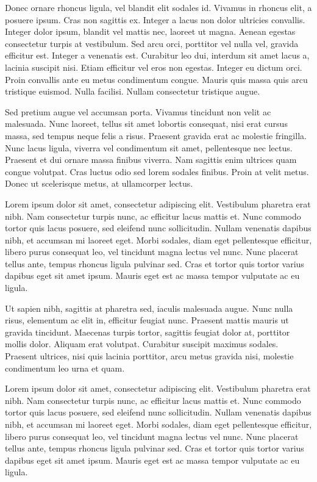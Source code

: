 \documentclass[a4paper]{memoir}
\begin{document}
Donec ornare rhoncus ligula, vel blandit elit sodales id. Vivamus in rhoncus elit, a posuere ipsum. Cras non sagittis ex. Integer a lacus non dolor ultricies convallis. Integer dolor ipsum, blandit vel mattis nec, laoreet ut magna. Aenean egestas consectetur turpis at vestibulum. Sed arcu orci, porttitor vel nulla vel, gravida efficitur est. Integer a venenatis est. Curabitur leo dui, interdum sit amet lacus a, lacinia suscipit nisi. Etiam efficitur vel eros non egestas. Integer eu dictum orci. Proin convallis ante eu metus condimentum congue. Mauris quis massa quis arcu tristique euismod. Nulla facilisi. Nullam consectetur tristique augue. 

Sed pretium augue vel accumsan porta. Vivamus tincidunt non velit ac malesuada. Nunc laoreet, tellus sit amet lobortis consequat, nisi erat cursus massa, sed tempus neque felis a risus. Praesent gravida erat ac molestie fringilla. Nunc lacus ligula, viverra vel condimentum sit amet, pellentesque nec lectus. Praesent et dui ornare massa finibus viverra. Nam sagittis enim ultrices quam congue volutpat. Cras luctus odio sed lorem sodales finibus. Proin at velit metus. Donec ut scelerisque metus, at ullamcorper lectus. 

Lorem ipsum dolor sit amet, consectetur adipiscing elit. Vestibulum pharetra erat nibh. Nam consectetur turpis nunc, ac efficitur lacus mattis et. Nunc commodo tortor quis lacus posuere, sed eleifend nunc sollicitudin. Nullam venenatis dapibus nibh, et accumsan mi laoreet eget. Morbi sodales, diam eget pellentesque efficitur, libero purus consequat leo, vel tincidunt magna lectus vel nunc. Nunc placerat tellus ante, tempus rhoncus ligula pulvinar sed. Cras et tortor quis tortor varius dapibus eget sit amet ipsum. Mauris eget est ac massa tempor vulputate ac eu ligula. 

Ut sapien nibh, sagittis at pharetra sed, iaculis malesuada augue. Nunc nulla risus, elementum ac elit in, efficitur feugiat nunc. Praesent mattis mauris ut gravida tincidunt. Maecenas turpis tortor, sagittis feugiat dolor at, porttitor mollis dolor. Aliquam erat volutpat. Curabitur suscipit maximus sodales. Praesent ultrices, nisi quis lacinia porttitor, arcu metus gravida nisi, molestie condimentum leo urna et quam. 

Lorem ipsum dolor sit amet, consectetur adipiscing elit. Vestibulum pharetra erat nibh. Nam consectetur turpis nunc, ac efficitur lacus mattis et. Nunc commodo tortor quis lacus posuere, sed eleifend nunc sollicitudin. Nullam venenatis dapibus nibh, et accumsan mi laoreet eget. Morbi sodales, diam eget pellentesque efficitur, libero purus consequat leo, vel tincidunt magna lectus vel nunc. Nunc placerat tellus ante, tempus rhoncus ligula pulvinar sed. Cras et tortor quis tortor varius dapibus eget sit amet ipsum. Mauris eget est ac massa tempor vulputate ac eu ligula. 
\end{document}
